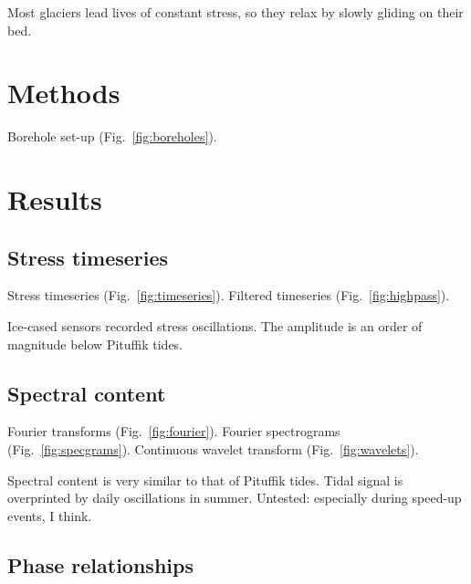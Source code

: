 \documentclass[utf8]{article}
\begin{document}
    Most glaciers lead lives of constant stress, so they relax by slowly
    gliding on their bed.

\section{Methods}

    Borehole set-up (Fig.~\ref{fig:boreholes}).

\section{Results}

\subsection{Stress timeseries}

    Stress timeseries (Fig.~\ref{fig:timeseries}).
    Filtered timeseries (Fig.~\ref{fig:highpass}).

    Ice-cased sensors recorded stress oscillations.
    The amplitude is an order of magnitude below Pituffik tides.

\subsection{Spectral content}

    Fourier transforms (Fig.~\ref{fig:fourier}).
    Fourier spectrograms (Fig.~\ref{fig:specgrams}).
    Continuous wavelet transform (Fig.~\ref{fig:wavelets}).

    Spectral content is very similar to that of Pituffik tides.
    Tidal signal is overprinted by daily oscillations in summer.
    Untested: especially during speed-up events, I think.

\subsection{Phase relationships}
\end{document}

